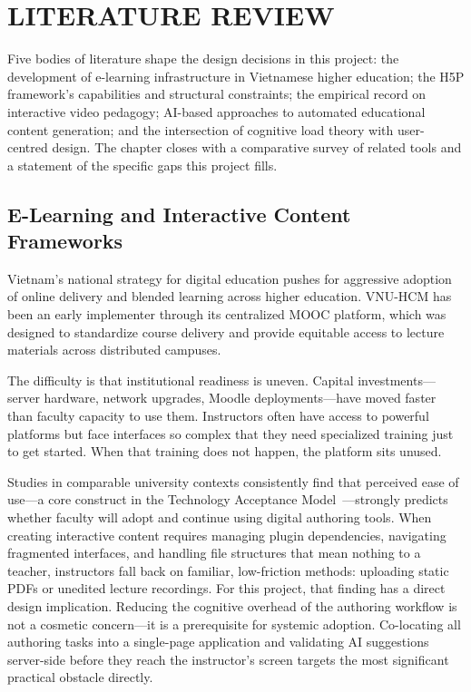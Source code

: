 
\chapter{LITERATURE REVIEW}
\label{ch:litreview}

Five bodies of literature shape the design decisions in this project: the development of e-learning infrastructure in Vietnamese higher education; the H5P framework's capabilities and structural constraints; the empirical record on interactive video pedagogy; AI-based approaches to automated educational content generation; and the intersection of cognitive load theory with user-centred design. The chapter closes with a comparative survey of related tools and a statement of the specific gaps this project fills.

\section{E-Learning and Interactive Content Frameworks}

Vietnam's national strategy for digital education pushes for aggressive adoption of online delivery and blended learning across higher education. VNU-HCM has been an early implementer through its centralized MOOC platform, which was designed to standardize course delivery and provide equitable access to lecture materials across distributed campuses.

The difficulty is that institutional readiness is uneven. Capital investments---server hardware, network upgrades, Moodle deployments---have moved faster than faculty capacity to use them. Instructors often have access to powerful platforms but face interfaces so complex that they need specialized training just to get started. When that training does not happen, the platform sits unused.

Studies in comparable university contexts consistently find that perceived ease of use---a core construct in the Technology Acceptance Model~\cite{davis1989,hadullo2017,garrison2008}---strongly predicts whether faculty will adopt and continue using digital authoring tools. When creating interactive content requires managing plugin dependencies, navigating fragmented interfaces, and handling file structures that mean nothing to a teacher, instructors fall back on familiar, low-friction methods: uploading static PDFs or unedited lecture recordings. For this project, that finding has a direct design implication. Reducing the cognitive overhead of the authoring workflow is not a cosmetic concern---it is a prerequisite for systemic adoption. Co-locating all authoring tasks into a single-page application and validating AI suggestions server-side before they reach the instructor's screen targets the most significant practical obstacle directly.

